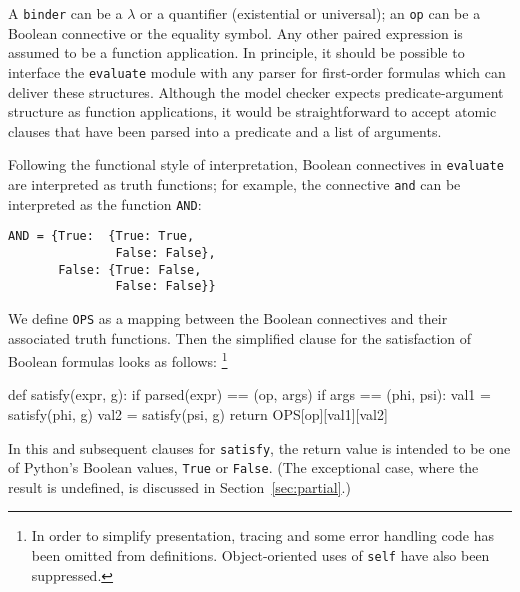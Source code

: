 \documentclass[11pt]{article}
\newcommand{\code}[1]{\texttt{#1}}
\begin{document}
A \code{binder} can be a $\lambda$ or a quantifier (existential or
universal); an \code{op} can be a Boolean connective or the equality
symbol. Any other paired expression is assumed to be a function
application. In principle, it should be possible to interface the
\code{evaluate} module with any parser for first-order formulas which
can deliver these structures. Although the model checker expects
predicate-argument structure as function applications, it would be
straightforward to accept atomic clauses that have been parsed into a
predicate and a list of arguments.

Following the functional style of interpretation, Boolean connectives
in \code{evaluate} are interpreted as truth functions; for example,
the connective \code{and} can be interpreted as the function
\code{AND}:
\begin{Verbatim}
AND = {True:  {True: True, 
               False: False},
       False: {True: False, 
               False: False}}
\end{Verbatim}
We define \code{OPS} as a mapping between the Boolean connectives
and their associated truth functions. Then the simplified clause for
the satisfaction of Boolean formulas looks as follows:%
\footnote{In order to simplify presentation, tracing and some error
  handling code has been omitted from definitions.  Object-oriented
  uses of \code{self} have also been suppressed.}
\begin{SmVerbatim}
def satisfy(expr, g):
   if parsed(expr) == (op, args) 
      if args == (phi, psi):
         val1 = satisfy(phi, g)
         val2 = satisfy(psi, g)
         return OPS[op][val1][val2]
\end{SmVerbatim}

In this and subsequent clauses for \code{satisfy}, the return value
is intended to be one of Python's Boolean values, \code{True} or
\code{False}. (The exceptional case, where the result is undefined,
is discussed in Section~\ref{sec:partial}.)
\end{document}
